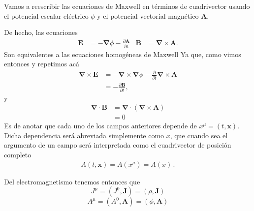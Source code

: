 Vamos a  reescribir las ecuaciones de Maxwell en términos de cuadrivector usando el potencial escalar eléctrico $\phi$ y el potencial vectorial magnético $\mathbf{A}$.

De hecho, las ecuaciones
\begin{align}
  \label{eq:phiach1}
  \mathbf{E}&=-\boldsymbol{\nabla}\phi-\frac{\partial\mathbf{A}}{\partial t}&
  \mathbf{B}&=\boldsymbol{\nabla}\times\mathbf{A}.
\end{align}
 Son equivalentes a las ecuaciones homogéneas de Maxwell Ya que, como vimos entonces y repetimos acá
\begin{align*}
  \boldsymbol{\nabla}\times\mathbf{E}&=-\boldsymbol{\nabla}\times\boldsymbol{\nabla}\phi-\frac{\partial}{\partial t}\boldsymbol{\nabla}\times\mathbf{A}\\
  &=-\frac{\partial\mathbf{B}}{\partial t},
\end{align*}
y
\begin{align*}
  \boldsymbol{\nabla}\cdot\mathbf{B}&=\boldsymbol{\nabla}\cdot(\boldsymbol{\nabla}\times\mathbf{A})\\
  &=0
\end{align*}
Es de anotar que cada uno de los campos anteriores depende de $x^\mu=(t,\boldsymbol{x})$. Dicha dependencia será abreviada simplemente como $x$, que cuando sea el argumento de un campo será interpretada como el cuadrivector de posición completo
\begin{align*}
  A(t, \boldsymbol{x}) = A(x^\mu) = A(x)\,.
\end{align*}

\begin{frame}
Del electromagnetismo tenemos entonces que
\begin{equation}
  \label{eq:cv_jmu}
  J^\mu=(J^0,\mathbf{J})=(\rho,\mathbf{J})
\end{equation}
\begin{equation}
  \label{eq:cv_phia}
  A^\mu=(A^0,\mathbf{A})=(\phi,\mathbf{A})
\end{equation}
\end{frame}


